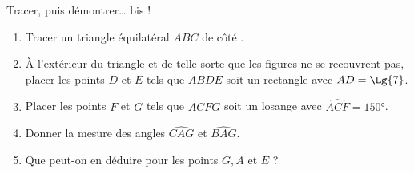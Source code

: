 \begin{Maquette}[Fiche,CorrigeFin,Colonnes=2]{}
\begin{multicols}{2}
      
      \begin{exercice}[Dur] %
         Tracer, puis démontrer\dots{} bis !
         \begin{enumerate}
            \item Tracer un triangle équilatéral $ABC$ de côté .
            \item À l'extérieur du triangle et de telle sorte que les figures ne se recouvrent pas, placer les points $D$ et $E$ tels que $ABDE$ soit un rectangle avec $AD =\Lg{7}$.
            \item Placer les points $F$ et $G$ tels que $ACFG$ soit un losange avec $\widehat{ACF} =\ang{150}$.
            \item Donner la mesure des angles $\widehat{CAG}$ et $\widehat{BAG}$.
            \item Que peut-on en déduire pour les points $G, A$ et $E$ ?
         \end{enumerate}
      \end{exercice}
      

\end{multicols}
\end{Maquette}
